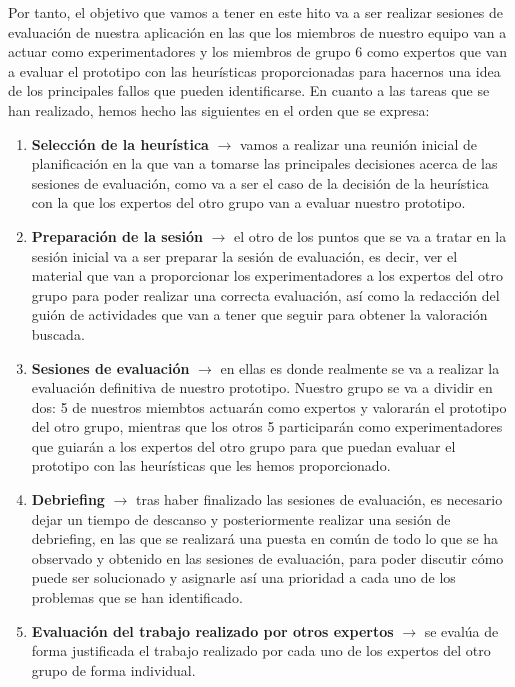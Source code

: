 Por tanto, el objetivo que vamos a tener en este hito va a ser realizar sesiones de evaluación de nuestra aplicación en las que los miembros
de nuestro equipo van a actuar como experimentadores y los miembros de grupo 6 como expertos que van a evaluar el prototipo con las heurísticas
proporcionadas para hacernos una idea de los principales fallos que pueden identificarse. En cuanto a las tareas que se han realizado, hemos hecho
las siguientes en el orden que se expresa:
\begin{enumerate}
    \item \textbf{Selección de la heurística} $\rightarrow$ vamos a realizar una reunión inicial de planificación en la que van a tomarse las principales
    decisiones acerca de las sesiones de evaluación, como va a ser el caso de la decisión de la heurística con la que los expertos del otro grupo van a evaluar
    nuestro prototipo.
    \item \textbf{Preparación de la sesión} $\rightarrow$ el otro de los puntos que se va a tratar en la sesión inicial va a ser preparar la sesión de evaluación,
    es decir, ver el material que van a proporcionar los experimentadores a los expertos del otro grupo para poder realizar una correcta evaluación, así como la
    redacción del guión de actividades que van a tener que seguir para obtener la valoración buscada.
    \item \textbf{Sesiones de evaluación} $\rightarrow$ en ellas es donde realmente se va a realizar la evaluación definitiva de nuestro prototipo. Nuestro grupo se va
    a dividir en dos: 5 de nuestros miembtos actuarán como expertos y valorarán el prototipo del otro grupo, mientras que los otros 5 participarán como experimentadores
    que guiarán a los expertos del otro grupo para que puedan evaluar el prototipo con las heurísticas que les hemos proporcionado.
    \item \textbf{Debriefing} $\rightarrow$ tras haber finalizado las sesiones de evaluación, es necesario dejar un tiempo de descanso y posteriormente realizar una sesión de
    debriefing, en las que se realizará una puesta en común de todo lo que se ha observado y obtenido en las sesiones de evaluación, para poder discutir cómo puede ser solucionado y
    asignarle así una prioridad a cada uno de los problemas que se han identificado.
    \item \textbf{Evaluación del trabajo realizado por otros expertos} $\rightarrow$ se evalúa de forma justificada el trabajo realizado por cada uno de los expertos del otro grupo de forma individual.

\end{enumerate}
